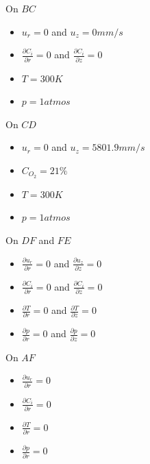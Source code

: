 \bigskip 
\noindent On $BC$
\begin{itemize}
\item $u_r = 0$ and $u_z=0 mm/s$
\item $\frac{\partial C_i}{\partial r} =0 $ and $\frac{\partial C_i}{\partial z} =0 $
\item $T = 300K$
\item $p=1 atmos$
\end{itemize}

\noindent On $CD$
\begin{itemize}
\item $u_r = 0$ and $u_z=5801.9 mm/s$
\item $ C_{O_2} =21 \% $
\item $T = 300K$
\item $p=1 atmos$
\end{itemize}

\noindent On $DF$ and $FE$
\begin{itemize}
\item $\frac{\partial u_r}{\partial r} =0 $ and $\frac{\partial u_z}{\partial z} =0 $
\item $\frac{\partial C_i}{\partial r} =0 $ and $\frac{\partial C_i}{\partial z} =0 $
\item $\frac{\partial T}{\partial r} =0 $ and $\frac{\partial T}{\partial z} =0 $
\item $\frac{\partial p}{\partial r} =0 $ and $\frac{\partial p}{\partial z} =0 $
\end{itemize}


\noindent On $AF$
\begin{itemize}
\item $\frac{\partial u_r}{\partial r} =0 $ 
\item $\frac{\partial C_i}{\partial r} =0 $ 
\item $\frac{\partial T}{\partial r} =0 $  
\item $\frac{\partial p}{\partial r} =0 $
\end{itemize}


